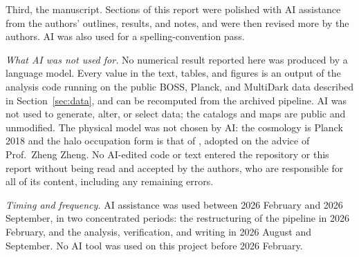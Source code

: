 \begin{acknowledgments}
Third, the manuscript. Sections of this report were polished with AI assistance
from the authors' outlines, results, and notes, and were then revised more by the
authors. AI was also used for a spelling-convention pass.

\emph{What AI was not used for.} No numerical result reported here was produced
by a language model. Every value in the text, tables, and figures is an output
of the analysis code running on the public BOSS, Planck, and MultiDark data
described in Section~\ref{sec:data}, and can be recomputed from the archived
pipeline. AI was not used to generate, alter, or select data; the catalogs and
maps are public and unmodified. The physical model was not chosen by AI: the
cosmology is Planck 2018 and the halo occupation form is that of
\citet{White2011}, adopted on the advice of Prof.\ Zheng Zheng. No AI-edited
code or text entered the repository or this report without being read and
accepted by the authors, who are responsible for all of its content, including
any remaining errors.

\emph{Timing and frequency.} AI assistance was used between 2026 February and
2026 September, in two concentrated periods: the restructuring of the pipeline
in 2026 February, and the analysis, verification, and writing in 2026 August
and September. No AI tool was used on this project before 2026 February.

\end{acknowledgments}

